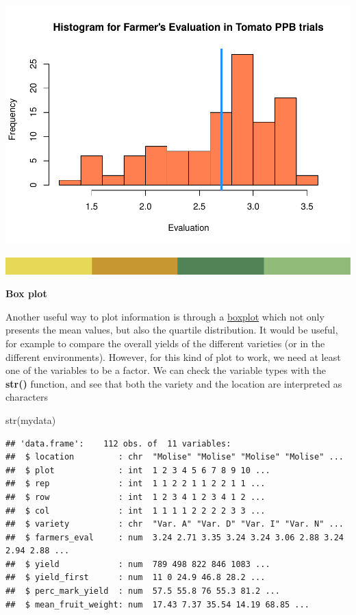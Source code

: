 \documentclass[
]{book}
\newenvironment{Shaded}{\begin{snugshade}}{\end{snugshade}}
\newcommand{\FunctionTok}[1]{\textcolor[rgb]{0.00,0.00,0.00}{#1}}
\newcommand{\NormalTok}[1]{#1}
\begin{document}
\includegraphics{PPB-Toolkit-for-R-and-R-Studio_files/figure-latex/unnamed-chunk-54-1.pdf}

\includegraphics{rsrstrip.png}

\textbf{Box plot}

Another useful way to plot information is through a \href{https://en.wikipedia.org/wiki/Box_plot}{boxplot} which not only presents the mean values, but also the quartile distribution. It would be useful, for example to compare the overall yields of the different varieties (or in the different environments). However, for this kind of plot to work, we need at least one of the variables to be a factor. We can check the variable types with the \textbf{str() } function, and see that both the variety and the location are interpreted as characters

\begin{Shaded}
\begin{Highlighting}[]
\FunctionTok{str}\NormalTok{(mydata)}
\end{Highlighting}
\end{Shaded}

\begin{verbatim}
## 'data.frame':    112 obs. of  11 variables:
##  $ location         : chr  "Molise" "Molise" "Molise" "Molise" ...
##  $ plot             : int  1 2 3 4 5 6 7 8 9 10 ...
##  $ rep              : int  1 1 2 2 1 1 2 2 1 1 ...
##  $ row              : int  1 2 3 4 1 2 3 4 1 2 ...
##  $ col              : int  1 1 1 1 2 2 2 2 3 3 ...
##  $ variety          : chr  "Var. A" "Var. D" "Var. I" "Var. N" ...
##  $ farmers_eval     : num  3.24 2.71 3.35 3.24 3.24 3.06 2.88 3.24 2.94 2.88 ...
##  $ yield            : num  789 498 822 846 1083 ...
##  $ yield_first      : num  11 0 24.9 46.8 28.2 ...
##  $ perc_mark_yield  : num  57.5 55.8 76 55.3 81.2 ...
##  $ mean_fruit_weight: num  17.43 7.37 35.54 14.19 68.85 ...
\end{verbatim}
\end{document}
